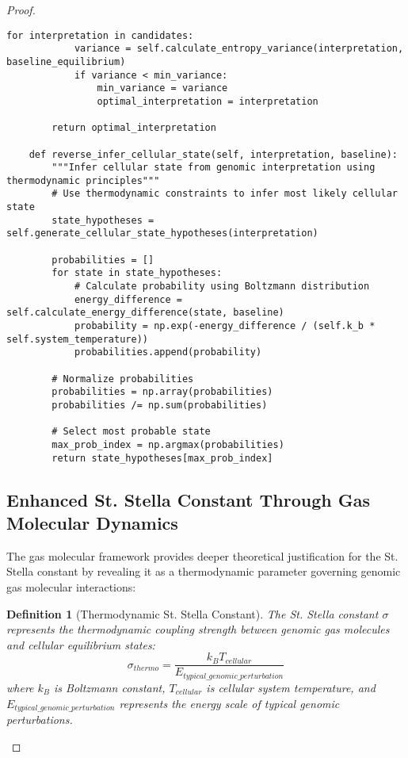 \documentclass[12pt,a4paper]{article}
\newtheorem{definition}[theorem]{Definition}
\begin{document}
\begin{proof}
\begin{lstlisting}[style=pythonstyle, caption=Gas Molecular Enhanced Genomic Processing]
        for interpretation in candidates:
            variance = self.calculate_entropy_variance(interpretation, baseline_equilibrium)
            if variance < min_variance:
                min_variance = variance
                optimal_interpretation = interpretation
        
        return optimal_interpretation
    
    def reverse_infer_cellular_state(self, interpretation, baseline):
        """Infer cellular state from genomic interpretation using thermodynamic principles"""
        # Use thermodynamic constraints to infer most likely cellular state
        state_hypotheses = self.generate_cellular_state_hypotheses(interpretation)
        
        probabilities = []
        for state in state_hypotheses:
            # Calculate probability using Boltzmann distribution
            energy_difference = self.calculate_energy_difference(state, baseline)
            probability = np.exp(-energy_difference / (self.k_b * self.system_temperature))
            probabilities.append(probability)
        
        # Normalize probabilities
        probabilities = np.array(probabilities)
        probabilities /= np.sum(probabilities)
        
        # Select most probable state
        max_prob_index = np.argmax(probabilities)
        return state_hypotheses[max_prob_index]
\end{lstlisting}

\subsection{Enhanced St. Stella Constant Through Gas Molecular Dynamics}

The gas molecular framework provides deeper theoretical justification for the St. Stella constant by revealing it as a thermodynamic parameter governing genomic gas molecular interactions:

\begin{definition}[Thermodynamic St. Stella Constant]
The St. Stella constant $\sigma$ represents the thermodynamic coupling strength between genomic gas molecules and cellular equilibrium states:
$$\sigma_{thermo} = \frac{k_B T_{cellular}}{E_{typical\_genomic\_perturbation}}$$
where $k_B$ is Boltzmann constant, $T_{cellular}$ is cellular system temperature, and $E_{typical\_genomic\_perturbation}$ represents the energy scale of typical genomic perturbations.
\end{definition}


\end{proof}
\end{document}
